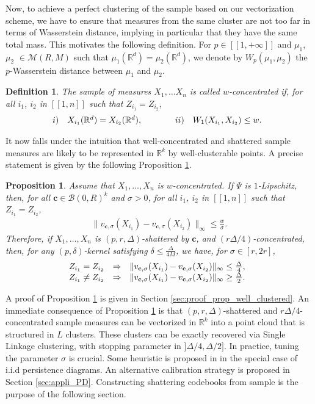 \documentclass[noinfoline,preprint]{article}
\newtheorem{defi}[theorem]{Definition}
\newtheorem{prop}[theorem]{Proposition}
\newcommand{\cb}{\mathbf{c}}
\newcommand{\R}{\mathbb{R}}
\renewcommand{\1}{\mathds 1}
\newcommand{\B}{\mathcal{B}}
\begin{document}
Now, to achieve a perfect clustering of the sample based on our vectorization scheme, we have to ensure that measures from the same cluster are not too far in terms of Wasserstein distance, implying in particular that they have the same total mass. This motivates the following definition. For $p\in [\![1,+\infty ]\!]$ and $\mu_1$, $\mu_2$ $\in \mathcal{M}(R,M)$ such that $\mu_1(\R^d) = \mu_2(\R^d)$, we denote by $W_p(\mu_1,\mu_2)$ the $p$-Wasserstein distance between $\mu_1$ and $\mu_2$.
\begin{defi}\label{def:contrated}
The sample of measures $X_1, \hdots X_n$ is called $w$-concentrated if, for all $i_1$, $i_2$ in $[\![1,n]\!]$ such that $Z_{i_1} = Z_{i_2}$,
\[
\begin{array}{@{}clccl}
i) & X_{i_1}(\mathbb{R}^d) = X_{i_2}(\mathbb{R}^d), & \qquad & ii) & W_1(X_{i_1},X_{i_2}) \leq w.
\end{array}
\]
\end{defi}
It now falls under the intuition that well-concentrated and shattered sample measures are likely to be represented in $\R^k$ by well-clusterable points. A precise statement is given by the following Proposition \ref{prop:well_clustered}.
\begin{prop}\label{prop:well_clustered}
Assume that $X_1, \hdots, X_n$ is $w$-concentrated. If $\Psi$ is $1$-Lipschitz, then, for all $\cb \in \B(0,R)^k$ and $\sigma >0$, for all $i_1$, $i_2$ in $[\![1,n]\!]$ such that $Z_{i_1} = Z_{i_2}$,
\begin{align*}
\| v_{\cb,\sigma}(X_{i_1}) - v_{\cb,\sigma}(X_{i_2}) \|_\infty \leq \frac{w}{\sigma}.
\end{align*}
Therefore, if $X_1, \hdots, X_n$ is $(p,r,\Delta)$-shattered by $\cb$, and $(r\Delta/4)$-concentrated, then, for any $(p,\delta)$-kernel satisfying $\delta \leq \frac{\Delta}{4M}$, we have, for $\sigma \in [r,2r]$,
\[
\begin{array}{@{}ccc}
Z_{i_1}=Z_{i_2} & \Rightarrow & \| v_{\cb,\sigma}(X_{i_1}) - v_{\cb,\sigma}(X_{i_2}) \|_\infty \leq \frac{\Delta}{4}, \\
Z_{i_1} \neq Z_{i_2} & \Rightarrow & \| v_{\cb,\sigma}(X_{i_1}) - v_{\cb,\sigma}(X_{i_2}) \|_\infty \geq \frac{\Delta}{2}.
\end{array}
\]
\end{prop}
A proof of Proposition \ref{prop:well_clustered} is given in Section \ref{sec:proof_prop_well_clustered}. An immediate consequence of Proposition \ref{prop:well_clustered} is that $(p,r,\Delta)$-shattered and $r\Delta/4$-concentrated sample measures can be vectorized in $\R^k$ into a point cloud that is structured in $L$ clusters. These clusters can be exactly recovered via Single Linkage clustering, with stopping parameter in $]\Delta/4, \Delta/2]$. In practice, tuning the parameter $\sigma$ is crucial. Some heuristic is proposed in \cite{Royer19} in the special case of i.i.d persistence diagrams. An alternative calibration strategy is proposed in Section \ref{sec:appli_PD}. Constructing shattering codebooks from sample is the purpose of the following section. 
          
\end{document}
